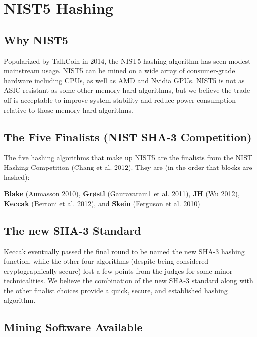 \documentclass[11pt,a4paperpaper,]{report}
\begin{document}
\newpage


\chapter{NIST5 Hashing}\label{nist5-hashing}

\section{Why NIST5}\label{why-nist5}

Popularized by TalkCoin in 2014, the NIST5 hashing algorithm has seen
modest mainstream usage. NIST5 can be mined on a wide array of
consumer-grade hardware including CPUs, as well as AMD and Nvidia GPUs.
NIST5 is not as ASIC resistant as some other memory hard algorithms, but
we believe the trade-off is acceptable to improve system stability and
reduce power consumption relative to those memory hard algorithms.

\section{The Five Finalists (NIST SHA-3
Competition)}\label{the-five-finalists-nist-sha-3-competition}

The five hashing algorithms that make up NIST5 are the finalists from
the NIST Hashing Competition (Chang et al. 2012). They are (in the order
that blocks are hashed):

\textbf{Blake} (Aumasson 2010), \textbf{Grøstl} (Gauravaram1 et al.
2011), \textbf{JH} (Wu 2012), \textbf{Keccak} (Bertoni et al. 2012), and
\textbf{Skein} (Ferguson et al. 2010)

\section{The new SHA-3 Standard}\label{the-new-sha-3-standard}

Keccak eventually passed the final round to be named the new SHA-3
hashing function, while the other four algorithms (despite being
considered cryptographically secure) lost a few points from the judges
for some minor technicalities. We believe the combination of the new
SHA-3 standard along with the other finalist choices provide a quick,
secure, and established hashing algorithm.

\section{Mining Software Available}\label{mining-software-available}
\end{document}
